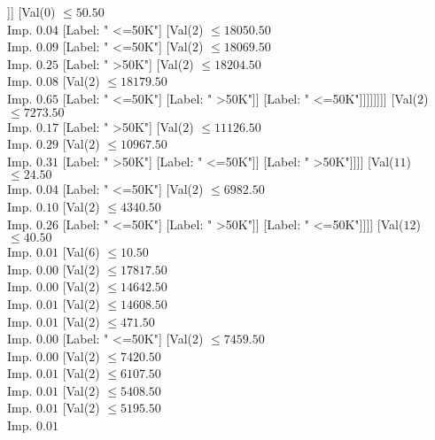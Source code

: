 \documentclass[margin=10pt]{standalone}
\begin{document}
\begin{forest}
															[Label: " >50K"]
															[Label: " <=50K"]]]
													[Val($0$) $ \leq 50.50$ \\ Imp. $0.04$
														[Label: " <=50K"]
														[Val($2$) $ \leq 18050.50$ \\ Imp. $0.09$
															[Label: " <=50K"]
															[Val($2$) $ \leq 18069.50$ \\ Imp. $0.25$
																[Label: " >50K"]
																[Val($2$) $ \leq 18204.50$ \\ Imp. $0.08$
																	[Val($2$) $ \leq 18179.50$ \\ Imp. $0.65$
																		[Label: " <=50K"]
																		[Label: " >50K"]]
																	[Label: " <=50K"]]]]]]]]
										[Val($2$) $ \leq 7273.50$ \\ Imp. $0.17$
											[Label: " >50K"]
											[Val($2$) $ \leq 11126.50$ \\ Imp. $0.29$
												[Val($2$) $ \leq 10967.50$ \\ Imp. $0.31$
													[Label: " >50K"]
													[Label: " <=50K"]]
												[Label: " >50K"]]]]
									[Val($11$) $ \leq 24.50$ \\ Imp. $0.04$
										[Label: " <=50K"]
										[Val($2$) $ \leq 6982.50$ \\ Imp. $0.10$
											[Val($2$) $ \leq 4340.50$ \\ Imp. $0.26$
												[Label: " <=50K"]
												[Label: " >50K"]]
											[Label: " <=50K"]]]]
								[Val($12$) $ \leq 40.50$ \\ Imp. $0.01$
									[Val($6$) $ \leq 10.50$ \\ Imp. $0.00$
										[Val($2$) $ \leq 17817.50$ \\ Imp. $0.00$
											[Val($2$) $ \leq 14642.50$ \\ Imp. $0.01$
												[Val($2$) $ \leq 14608.50$ \\ Imp. $0.01$
													[Val($2$) $ \leq 471.50$ \\ Imp. $0.00$
														[Label: " <=50K"]
														[Val($2$) $ \leq 7459.50$ \\ Imp. $0.00$
															[Val($2$) $ \leq 7420.50$ \\ Imp. $0.01$
																[Val($2$) $ \leq 6107.50$ \\ Imp. $0.01$
																	[Val($2$) $ \leq 5408.50$ \\ Imp. $0.01$
																		[Val($2$) $ \leq 5195.50$ \\ Imp. $0.01$

\end{forest}
\end{document}
